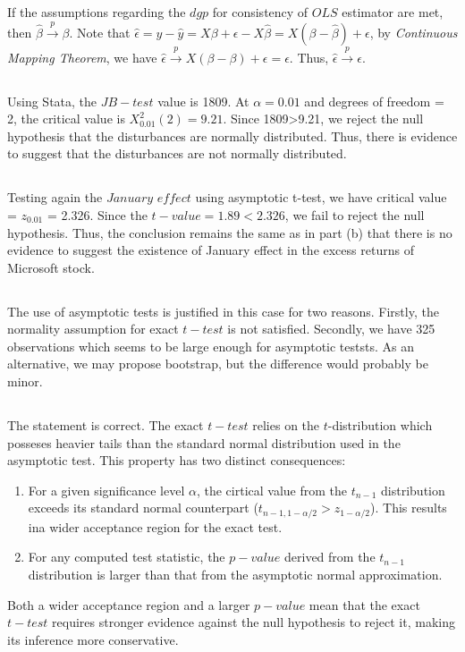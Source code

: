 \subsection{}
If the assumptions regarding the $dgp$  for consistency of $OLS$ estimator are met, then $\hat{\beta} \overset{p}{\rightarrow} \beta$. Note that $\hat{\epsilon} = y - \hat{y} =  X\beta + \epsilon - X\hat{\beta} = X(\beta - \hat{\beta}) + \epsilon$, by \textit{Continuous Mapping Theorem}, we have  $\hat{\epsilon} \overset{p}{\rightarrow} X(\beta - \beta) + \epsilon = \epsilon$. Thus, $\hat{\epsilon} \overset{p}{\rightarrow} \epsilon$.

\subsection{}

Using Stata, the $JB-test$ value is 1809. At $\alpha=0.01$ and degrees of freedom  = 2, the critical value is $X^2_{0.01}(2) = 9.21$. Since 1809>9.21, we reject the null hypothesis that the disturbances are normally distributed. Thus, there is evidence to suggest that the disturbances are not normally distributed.

\subsection{}
Testing again the $January$ $effect$ using asymptotic t-test, we have critical value =  $z_{0.01}$ = 2.326. Since the $t-value = 1.89 < 2.326$, we fail to reject the null hypothesis. Thus, the conclusion remains the same as in part (b) that there is no evidence to suggest the existence of January effect in the excess returns of Microsoft stock. 

\subsection{}
The use of asymptotic tests is justified in this case for two reasons. Firstly, the normality assumption for exact $t-test$ is not satisfied. Secondly, we have 325 observations which seems to be large enough for asymptotic teststs. As an alternative, we may propose bootstrap, but the difference would probably be minor. 

\subsection{}
The statement is correct. The exact $t-test$ relies on the $t$-distribution which posseses heavier tails than the standard normal distribution used in the asymptotic test. This property has two distinct consequences:
\begin{enumerate}
\item For a given significance level $\alpha$, the cirtical value from the $t_{n-1}$ distribution exceeds its standard normal counterpart ($t_{n-1,1-\alpha/2} > z_{1-\alpha/2}$). This results ina wider acceptance region for the exact test.
\item For any computed test statistic, the $p-value$ derived from the $t_{n-1}$ distribution is larger than that from the asymptotic normal approximation. 
\end{enumerate}

Both a wider acceptance region and a larger $p-value$ mean that the exact $t-test$ requires stronger evidence against the null hypothesis to reject it, making its inference more conservative. 